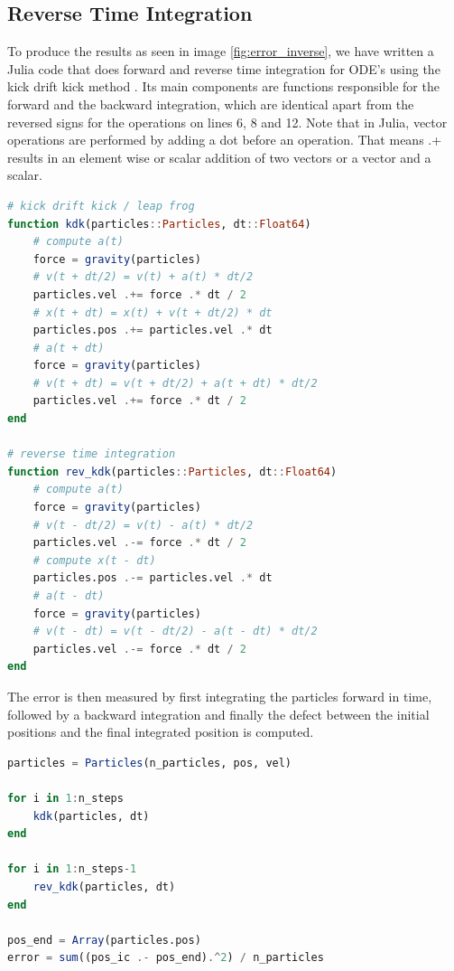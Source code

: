 \documentclass{article}
\begin{document}
{\begin{appendices}
\subsection{Reverse Time Integration}
\label{rev-integration}

To produce the results as seen in image \ref{fig:error_inverse}, we have written a Julia code that does forward and reverse time integration for ODE's using the kick drift kick method \cite{hut1995building}. Its main components are functions responsible for the forward and the backward integration, which are identical apart from the reversed signs for the operations on lines 6, 8 and 12. Note that in Julia, vector operations are performed by adding a dot before an operation. That means {.+} results in an element wise or scalar addition of two vectors or a vector and a scalar.

\begin{lstlisting}[language=Julia]
# kick drift kick / leap frog
function kdk(particles::Particles, dt::Float64)
    # compute a(t)
    force = gravity(particles)
    # v(t + dt/2) = v(t) + a(t) * dt/2
    particles.vel .+= force .* dt / 2
    # x(t + dt) = x(t) + v(t + dt/2) * dt
    particles.pos .+= particles.vel .* dt
    # a(t + dt)
    force = gravity(particles)
    # v(t + dt) = v(t + dt/2) + a(t + dt) * dt/2
    particles.vel .+= force .* dt / 2
end

# reverse time integration
function rev_kdk(particles::Particles, dt::Float64)
    # compute a(t)
    force = gravity(particles)
    # v(t - dt/2) = v(t) - a(t) * dt/2
    particles.vel .-= force .* dt / 2
    # compute x(t - dt)
    particles.pos .-= particles.vel .* dt
    # a(t - dt)
    force = gravity(particles)
    # v(t - dt) = v(t - dt/2) - a(t - dt) * dt/2
    particles.vel .-= force .* dt / 2
end
\end{lstlisting}

The error is then measured by first integrating the particles forward in time, followed by a backward integration and finally the defect between the initial positions and the final integrated position is computed.

\begin{lstlisting}[language=Julia]
particles = Particles(n_particles, pos, vel)

for i in 1:n_steps
    kdk(particles, dt)
end

for i in 1:n_steps-1
    rev_kdk(particles, dt)
end

pos_end = Array(particles.pos)
error = sum((pos_ic .- pos_end).^2) / n_particles
\end{lstlisting}



\end{appendices}}
\end{document}
